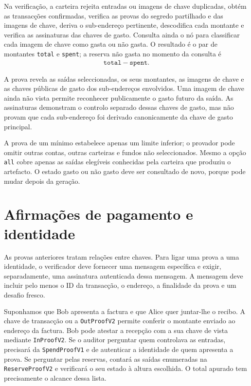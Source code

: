 %
Na verificação, a carteira rejeita entradas ou imagens de chave duplicadas,
obtém as transacções confirmadas, verifica as provas do segredo partilhado e
das imagens de chave, deriva o sub-endereço pertinente, descodifica cada
montante e verifica as assinaturas das chaves de gasto. Consulta ainda o nó
para classificar cada imagem de chave como gasta ou não gasta. O resultado é
o par de montantes \texttt{total} e \texttt{spent}; a reserva não gasta no
momento da consulta é
\begin{align*}
 \texttt{total}-\texttt{spent}.
\end{align*}

A prova revela as saídas seleccionadas, os seus montantes, as imagens de
chave e as chaves públicas de gasto dos sub-endereços envolvidos. Uma imagem
de chave ainda não vista permite reconhecer publicamente o gasto futuro da
saída. As assinaturas demonstram o controlo separado dessas chaves de gasto,
mas não provam que cada sub-endereço foi derivado canonicamente da chave de
gasto principal.

A prova de um mínimo estabelece apenas um limite inferior; o provador pode
omitir outras contas, outras carteiras e fundos não seleccionados. Mesmo a
opção \texttt{all} cobre apenas as saídas elegíveis conhecidas pela carteira
que produziu o artefacto. O estado gasto ou não gasto deve ser consultado de
novo, porque pode mudar depois da geração.



\section{Afirmações de pagamento e identidade}

As provas anteriores tratam relações entre chaves. Para ligar uma prova a uma identidade, o
verificador deve fornecer uma mensagem específica e exigir, separadamente,
uma assinatura autenticada dessa mensagem. A mensagem deve incluir pelo menos
o ID da transacção, o endereço, a finalidade da prova e um desafio fresco.

Suponhamos que Bob apresenta a factura e que Alice quer juntar-lhe o recibo.
A chave de transacção ou a \texttt{OutProofV2} permite conferir o montante
enviado ao endereço da factura. Bob pode atestar a recepção com a sua chave
de vista mediante \texttt{InProofV2}. Se o auditor perguntar quem controlava
as entradas, precisará da \texttt{SpendProofV1} e de autenticar a identidade
de quem apresenta a prova. Se perguntar pelas reservas, contará as saídas
enumeradas na \texttt{ReserveProofV2} e verificará o seu estado à altura
escolhida. O total apurado tem precisamente o alcance dessa lista.

